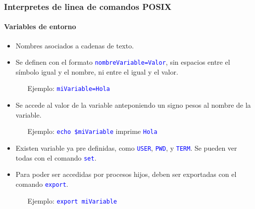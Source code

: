 \documentclass[11pt,a4paper,spanish]{beamer}
\newcommand{\cw}[1]{\mbox{\texttt{\textcolor{blue}{#1}}}}
\begin{document}
\begin{frame}

    \frametitle{Interpretes de linea de comandos POSIX}
    \framesubtitle{Variables de entorno}

    \begin{itemize}
        \item Nombres asociados a cadenas de texto.\pause
        \item Se definen con el formato \cw{nombreVariable=Valor}, sin
            espacios entre el símbolo igual y el nombre, ni entre el igual y
            el valor.
        \begin{itemize}
            \item[Ejemplo:] \cw{miVariable=Hola}\pause
        \end{itemize}
        \item Se accede al valor de la variable anteponiendo un signo pesos al
            nombre de la variable.
        \begin{itemize}
            \item[Ejemplo:] \cw{echo \$miVariable} imprime
                \cw{Hola}\pause
        \end{itemize}
        \item Existen variable ya pre definidas, como \cw{USER},
            \cw{PWD}, y \cw{TERM}. Se pueden ver todas con el
            comando \cw{set}.\pause
        \item Para poder ser accedidas por procesos hijos, deben ser
            exportadas con el comando \cw{export}.
        \begin{itemize}
            \item[Ejemplo:] \cw{export miVariable}
        \end{itemize}
    \end{itemize}

\end{frame}
\end{document}
